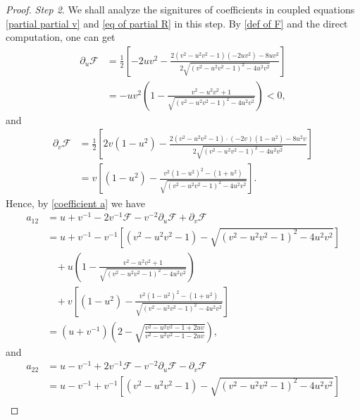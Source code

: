 \documentclass[10pt,leqno]{amsart}
\numberwithin{equation}{section}
\begin{document}
\begin{proof}
	{\textit{Step 2}}. We shall analyze the signitures of coefficients in coupled equations \eqref{partial partial v} and \eqref{eq of partial R} in this step. By \eqref{def of F} and the direct computation, one can get
	\begin{equation} \label{partial u F}
		\begin{aligned}
			\partial_{u}\mathcal{F} & =  \frac{1}{2}\left[ -2uv^2 - \frac{2(v^2-u^{2}v^2-1) ( -2uv^2 ) - 8 uv^2 }{2\sqrt{(v^2-u^{2}v^2-1)^2 -4u^{2}v^{2} }} \right] \\
			& =  -uv^{2} \left(  1- \frac{v^2-u^{2}v^2+1 }{\sqrt{(v^2-u^{2}v^2-1)^2 -4u^{2}v^{2} }} \right) <0 ,
		\end{aligned}
	\end{equation}
	and
	\begin{equation}
		\begin{aligned}
			\partial_{v}\mathcal{F}& =  \frac{1}{2}\left[ 2v(1-u^2) - \frac{2(v^2-u^{2}v^2-1) \cdot(-2v)(1-u^2)  - 8 u^2 v }{2\sqrt{(v^2-u^{2}v^2-1)^2 -4u^{2}v^{2} }} \right]  \\
			& = v \left[ (1-u^2) - \frac{v^2(1-u^{2})^{2} - (1+u^2) }{\sqrt{(v^2-u^{2}v^2-1)^2 -4u^{2}v^{2} }} \right].
		\end{aligned}
	\end{equation}
	Hence, by \eqref{coefficient a} we have
	\begin{equation*} 
		\begin{aligned}
			a_{12} & =u+v^{-1}-2v^{-1}\mathcal{F}- v^{-2} \partial_{u}\mathcal{F} + \partial_{v}\mathcal{F} \\
			& =u+v^{-1}- v^{-1} \left[ (v^2-u^{2}v^2-1)-\sqrt{(v^2-u^{2}v^2-1)^2 -4u^{2}v^{2} }\right]  \\
			& \ \ \ \ + u \left(   1- \frac{v^2-u^{2}v^2+1 }{\sqrt{(v^2-u^{2}v^2-1)^2 -4u^{2}v^{2} }}  \right)\\
			& \ \ \ \   + v \left[ (1-u^2) - \frac{v^2(1-u^{2})^{2} - (1+u^2) }{\sqrt{(v^2-u^{2}v^2-1)^2 -4u^{2}v^{2} }} \right]   \\
			& = (u+v^{-1}) \left( 2- \sqrt{\frac{v^2-u^{2}v^2-1+2uv}{v^2-u^{2}v^2-1-2uv}} \right) ,
		\end{aligned}
	\end{equation*}	
	and
	\begin{equation*} 
		\begin{aligned}
			a_{22} & =u-v^{-1}+2v^{-1}\mathcal{F}- v^{-2} \partial_{u}\mathcal{F} - \partial_{v}\mathcal{F} \\
			& =u-v^{-1}+ v^{-1} \left[ (v^2-u^{2}v^2-1)-\sqrt{(v^2-u^{2}v^2-1)^2 -4u^{2}v^{2} }\right]  \\

\end{aligned}
\end{equation*}
\end{proof}
\end{document}
